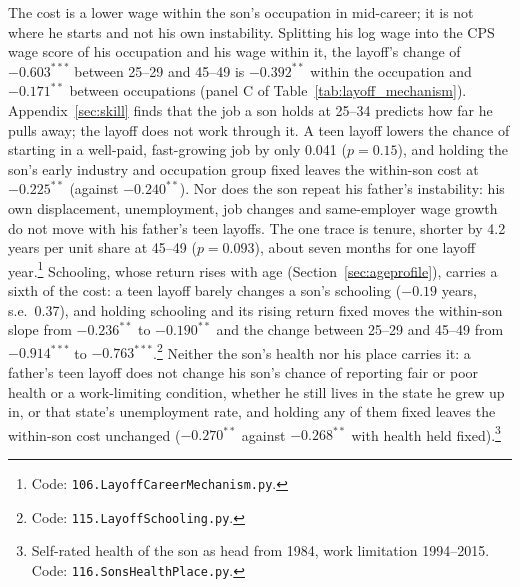 
The cost is a lower wage within the son's occupation in mid-career; it is not where he starts and not his own
instability. Splitting his log wage into the CPS wage score of his occupation and his wage within it, the layoff's change
of $-0.603^{***}$ between 25--29 and 45--49 is $-0.392^{**}$ within the occupation and $-0.171^{**}$ between occupations
(panel C of Table~\ref{tab:layoff_mechanism}). Appendix~\ref{sec:skill} finds that the job a son holds at 25--34 predicts
how far he pulls away; the layoff does not work through it. A teen layoff lowers the chance of starting in a well-paid,
fast-growing job by only 0.041 ($p = 0.15$), and holding the son's early industry and occupation group fixed leaves the
within-son cost at $-0.225^{**}$ (against $-0.240^{**}$). Nor does the son repeat his father's instability: his own
displacement, unemployment, job changes and same-employer wage growth do not move with his father's teen layoffs. The one
trace is tenure, shorter by 4.2 years per unit share at 45--49 ($p = 0.093$), about seven months for one layoff
year.\footnote{Code: \texttt{106.LayoffCareerMechanism.py}.} Schooling, whose return rises with age
(Section~\ref{sec:ageprofile}), carries a sixth of the cost: a teen layoff barely changes a son's schooling ($-0.19$
years, s.e.\ 0.37), and holding schooling and its rising return fixed moves the within-son slope from $-0.236^{**}$ to
$-0.190^{**}$ and the change between 25--29 and 45--49 from $-0.914^{***}$ to $-0.763^{***}$.\footnote{Code:
\texttt{115.LayoffSchooling.py}.} Neither the son's health nor his place carries it: a father's teen layoff does not
change his son's chance of reporting fair or poor health or a work-limiting condition, whether he still lives in the
state he grew up in, or that state's unemployment rate, and holding any of them fixed leaves the within-son cost
unchanged ($-0.270^{**}$ against $-0.268^{**}$ with health held fixed).\footnote{Self-rated health of the son as head
from 1984, work limitation 1994--2015. Code: \texttt{116.SonsHealthPlace.py}.}

